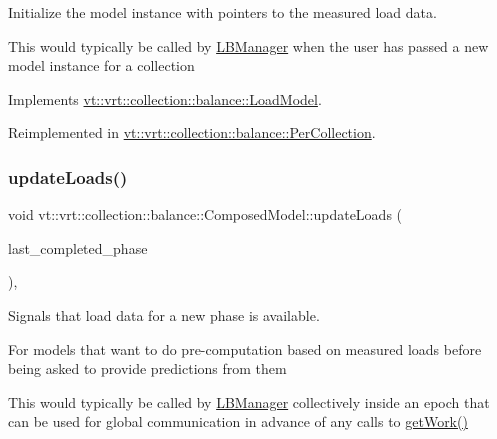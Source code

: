 Initialize the model instance with pointers to the measured load data. 

This would typically be called by \hyperlink{structvt_1_1vrt_1_1collection_1_1balance_1_1_l_b_manager}{L\+B\+Manager} when the user has passed a new model instance for a collection 

Implements \hyperlink{structvt_1_1vrt_1_1collection_1_1balance_1_1_load_model_a07512b8d95025a21a7c25cc3fdb817ad}{vt\+::vrt\+::collection\+::balance\+::\+Load\+Model}.



Reimplemented in \hyperlink{structvt_1_1vrt_1_1collection_1_1balance_1_1_per_collection_aba8f472fbe40c44c9f0f9028afe29cfc}{vt\+::vrt\+::collection\+::balance\+::\+Per\+Collection}.

\mbox{\label{classvt_1_1vrt_1_1collection_1_1balance_1_1_composed_model_ad8108b4392d63b7f09e443920a64933a}} 
\subsubsection{\texorpdfstring{update\+Loads()}{updateLoads()}}
{\footnotesize\ttfamily void vt\+::vrt\+::collection\+::balance\+::\+Composed\+Model\+::update\+Loads (\begin{DoxyParamCaption}\item[{\hyperlink{namespacevt_a46ce6733d5cdbd735d561b7b4029f6d7}{Phase\+Type}}]{last\+\_\+completed\+\_\+phase }\end{DoxyParamCaption})\hspace{0.3cm}{\ttfamily [override]}, {\ttfamily [virtual]}}



Signals that load data for a new phase is available. 

For models that want to do pre-\/computation based on measured loads before being asked to provide predictions from them

This would typically be called by \hyperlink{structvt_1_1vrt_1_1collection_1_1balance_1_1_l_b_manager}{L\+B\+Manager} collectively inside an epoch that can be used for global communication in advance of any calls to \hyperlink{classvt_1_1vrt_1_1collection_1_1balance_1_1_composed_model_a9410479ba5a5950fd56bb076717e48e5}{get\+Work()}

